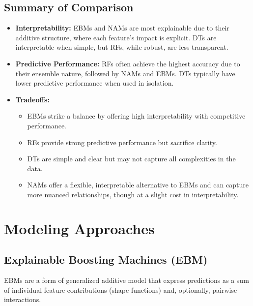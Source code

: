 \documentclass{article}
\begin{document}
\subsection*{Summary of Comparison}
\begin{itemize}
    \item \textbf{Interpretability:} EBMs and NAMs are most explainable due to their additive structure, where each feature's impact is explicit. DTs are interpretable when simple, but RFs, while robust, are less transparent.
    \item \textbf{Predictive Performance:} RFs often achieve the highest accuracy due to their ensemble nature, followed by NAMs and EBMs. DTs typically have lower predictive performance when used in isolation.
    \item \textbf{Tradeoffs:} 
    \begin{itemize}
        \item EBMs strike a balance by offering high interpretability with competitive performance.
        \item RFs provide strong predictive performance but sacrifice clarity.
        \item DTs are simple and clear but may not capture all complexities in the data.
        \item NAMs offer a flexible, interpretable alternative to EBMs and can capture more nuanced relationships, though at a slight cost in interpretability.
    \end{itemize}
\end{itemize}


\section{Modeling Approaches}

\subsection{Explainable Boosting Machines (EBM)}
EBMs are a form of generalized additive model that express predictions as a sum of individual feature contributions (shape functions) and, optionally, pairwise interactions.
\end{document}
